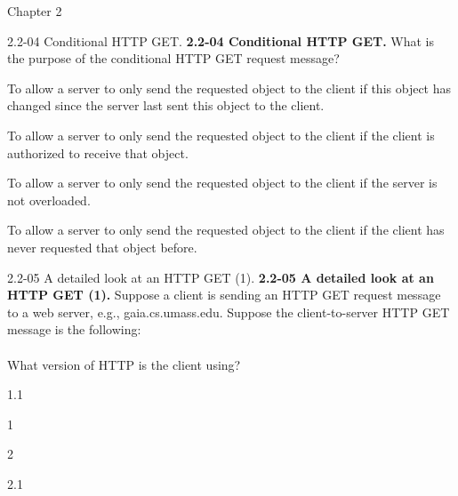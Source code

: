 \documentclass[11pt]{article}
\begin{document}
\begin{quiz}{Chapter 2}
\begin{multi}[points=1,shuffle]{2.2-04 Conditional HTTP GET.}
\textbf{2.2-04 Conditional HTTP GET. } What is the purpose of the conditional HTTP GET request message?
\item* To allow a server to only send the requested object to the client if this object has changed since the server last sent this object to the client.
\item To allow a server to only send the requested object to the client if the client is authorized to receive that object.
\item To allow a server to only send the requested object to the client if the server is not overloaded.
\item To allow a server to only send the requested object to the client if the client has never requested that object before.
\end{multi}

\begin{multi}[points=1,shuffle]{2.2-05 A detailed look at an HTTP GET (1).}
\textbf{2.2-05 A detailed look at an HTTP GET (1).} 
Suppose a client is sending an HTTP GET request message to a web server, e.g., gaia.cs.umass.edu. Suppose the client-to-server HTTP GET message is the following:\\

\\

What version of HTTP is the client using?
\item* 1.1
\item 1
\item 2
\item 2.1
\end{multi}


\end{quiz}
\end{document}
